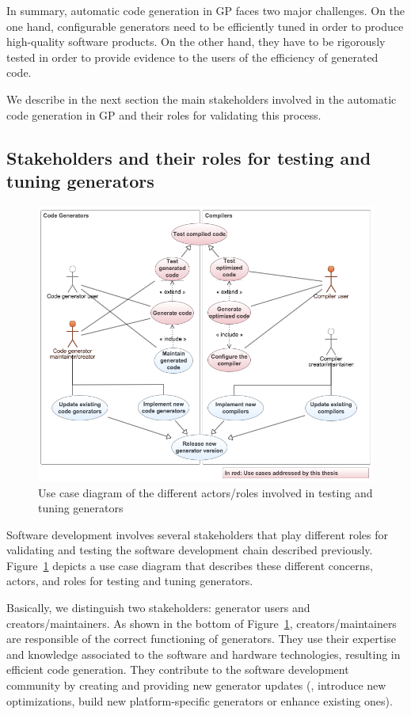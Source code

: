 In summary, automatic code generation in GP faces two major challenges. On the one hand, configurable generators need to be efficiently tuned in order to produce high-quality software products. On the other hand, they have to be rigorously tested in order to provide evidence to the users of the efficiency of generated code.

We describe in the next section the main stakeholders involved in the automatic code generation in GP and their roles for validating this process.


\subsection{Stakeholders and their roles for testing and tuning generators}
\begin{figure}[h]
	\center
	\includegraphics[scale=0.55]{Background/fig/usecase}
	\caption{Use case diagram of the different actors/roles involved in testing and tuning generators}
	\label{fig:usecase}
\end{figure}
Software development involves several stakeholders that play different roles for validating and testing the software development chain described previously.
Figure~\ref{fig:usecase} depicts a use case diagram that describes these different concerns, actors, and roles for testing and tuning generators.

Basically, we distinguish two stakeholders: generator users and creators/maintainers. As shown in the bottom of Figure~\ref{fig:usecase}, creators/maintainers are responsible of the correct functioning of generators. They use their expertise and knowledge associated to the software and hardware technologies, resulting in efficient code generation. They contribute to the software development community by creating and providing new generator updates (\eg, introduce new optimizations, build new platform-specific generators or enhance existing ones).

